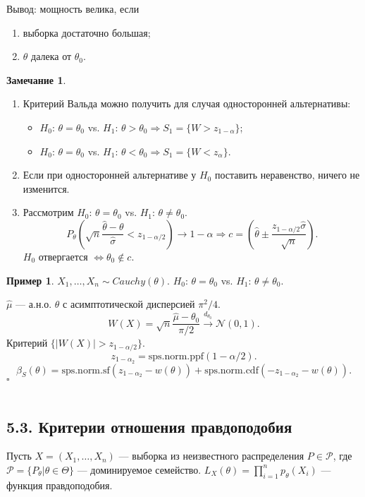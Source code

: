 \documentclass[12pt]{report}
\newenvironment{solution}{{\bfseries Решение:}}{$\square$\\\\}
\theoremstyle{definition}
\newtheorem{example}{Пример}
\newtheorem{remark}{Замечание}
\begin{document}
Вывод: мощность велика, если
\begin{enumerate}
	\item выборка достаточно большая;
	\item $\theta$ далека от $\theta_0$.
\end{enumerate}
\begin{remark}
	$\;$
	\begin{enumerate}
		\item Критерий Вальда можно получить для случая односторонней альтернативы:
			\begin{itemize}
				\item $H_0$: $\theta = \theta_0$ vs. $H_1$: $\theta > \theta_0 \Rightarrow S_1 = \{W > z_{1-\alpha}\}$;
				\item $H_0$: $\theta = \theta_0$ vs. $H_1$: $\theta < \theta_0 \Rightarrow S_1 = \{W < z_{\alpha}\}$.
			\end{itemize}
		\item  Если при односторонней альтернативе у $H_0$ поставить неравенство, ничего не изменится.
		\item Рассмотрим $H_0$: $\theta = \theta_0$ vs. $H_1$: $\theta \neq \theta_0$.
			$$P_\theta\left(\sqrt{n}\dfrac{\hat{\theta} - \theta}{\hat{\sigma}} < z_{1-\alpha/2}\right) \rightarrow 1 - \alpha \Rightarrow c = \left(\hat{\theta} \pm \dfrac{z_{1 -\alpha/2} \hat{\sigma}}{\sqrt{n}}\right).$$
			$H_0$ отвергается $\Leftrightarrow \theta_0 \notin c$.
	\end{enumerate}
\end{remark}
\begin{example}
	$X_1, \ldots, X_n \sim Cauchy(\theta)$. $H_0$: $\theta = \theta_0$ vs. $H_1$: $\theta \neq \theta_0$.
\end{example}
\begin{solution}
	$\hat{\mu}$ — а.н.о. $\theta$ с асимптотической дисперсией $\pi^2 / 4$.
	$$W(X) = \sqrt{n}\dfrac{\hat{\mu} - \theta_0}{\pi/2} \xrightarrow{d_{\theta_0}} \mathcal{N}(0, 1).$$
	Критерий $\{|W(X)| > z_{1-\alpha/2}\}$.
	$$z_{1-\alpha_2} = \text{sps.norm.ppf}(1 - \alpha/2).$$
	$$\beta_S(\theta) = \text{sps.norm.sf}(z_{1-\alpha_2} - w(\theta)) + \text{sps.norm.cdf}(-z_{1-\alpha_2} - w(\theta)).$$
\end{solution}

\subsection{5.3. Критерии отношения правдоподобия}
Пусть $X = (X_1, \ldots, X_n)$ — выборка из неизвестного распределения $P \in \mathscr{P}$, где $\mathscr{P} = \{P_\theta|\theta \in \Theta\}$ — доминируемое семейство. $L_X(\theta) = \displaystyle{\prod_{i=1}^n p_\theta(X_i)}$ — функция правдоподобия.
\end{document}
